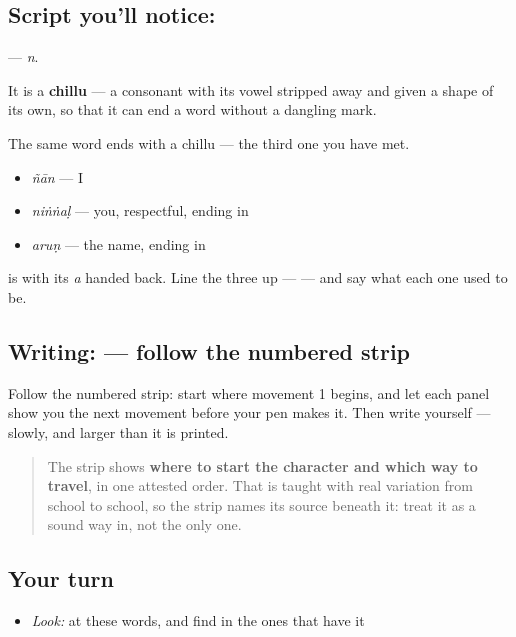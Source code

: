 \subsection*{Script you'll notice: }
\textbf{} — \emph{n}.

It is a \textbf{chillu} — a consonant with its vowel stripped away and given a shape of its own, so that it can end a word without a dangling mark.

The same word ends with a chillu — the third one you have met.

\begin{itemize}
\raggedright
  \item \textbf{} \emph{ñān} — I
  \item \textbf{} \emph{niṅṅaḷ} — you, respectful, ending in \textbf{}
  \item \textbf{} \emph{aruṇ} — the name, ending in \textbf{}
\end{itemize}

\textbf{} is \textbf{} with its \emph{a} handed back. Line the three up — \textbf{  } — and say what each one used to be.

\subsection*{Writing:  — follow the numbered strip}

Follow the numbered strip: start where movement 1 begins, and let each panel show you the next movement before your pen makes it. Then write  yourself — slowly, and larger than it is printed.

\begin{quote}
The strip shows \textbf{where to start the character and which way to travel}, in one attested order. That is taught with real variation from school to school, so the strip names its source beneath it: treat it as a sound way in, not the only one.
\end{quote}

\subsection*{Your turn}
\begin{itemize}
\raggedright
  \item \emph{Look:} at these words, and find  in the ones that have it
\end{itemize}

